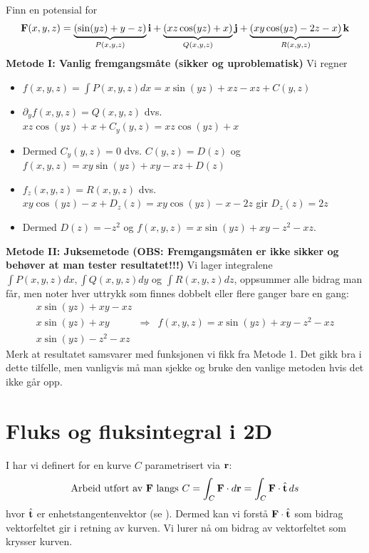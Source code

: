 
\begin{eks}{}
Finn en potensial for 
\[\mathbf{F}(x,y,z)=\underbrace{(\sin(yz)+y-z)}_{P(x,y,z)}\mathbf{i}+\underbrace{(xz\cos(yz)+x)}_{Q(x,y,z)}\mathbf{j}+\underbrace{(xy\cos(yz)-2z-x)}_{R(x,y,z)}\mathbf{k}\]
\textbf{Metode I: Vanlig fremgangsmåte (sikker og uproblematisk)} Vi regner
\begin{itemize}
\item $f(x,y,z)=\int P(x,y,z)dx = x\sin(yz)+xz-xz+C(y,z)$
\item $\partial_y f(x,y,z) = Q(x,y,z)$ dvs. $xz\cos (yz)+x+C_y(y,z)=xz\cos(yz)+x$
\item Dermed $C_y(y,z)=0$ dvs. $C(y,z)=D(z)$ og $f(x,y,z)=xy\sin (yz)+xy-xz+D(z)$
\item $f_z(x,y,z)=R(x,y,z)$ dvs. $xy\cos(yz)-x+D_z(z)=xy\cos(yz)-x-2z$ gir $D_z(z)=2z$
\item Dermed $D(z)=-z^2$ og $f(x,y,z)=x\sin(yz)+xy-z^2-xz$.
\end{itemize}
\textbf{Metode II: Juksemetode (OBS: Fremgangsmåten er ikke sikker og behøver at man tester resultatet!!!)}
Vi lager integralene $\int P(x,y,z)dx, \int Q(x,y,z)dy$ og $\int R(x,y,z)dz$, oppsummer alle bidrag man får, men noter hver uttrykk som finnes dobbelt eller flere ganger bare en gang:
\begin{align*}
x\sin(yz)+xy-xz &&\\
x \sin (yz)+xy  & \Rightarrow& f(x,y,z)=x\sin (yz)+xy-z^2-xz\\
x\sin (yz)-z^2-xz &&
\end{align*}
Merk at resultatet samsvarer med funksjonen vi fikk fra Metode 1. Det gikk bra i dette tilfelle, men vanligvis må man sjekke og bruke den vanlige metoden hvis det ikke går opp.
\end{eks}

%
%
%
\section{Fluks og fluksintegral i 2D}

I  har vi definert for en kurve $C$ parametrisert via $\mathbf{r}$:
\[
\text{Arbeid utført av } \mathbf{F} \text{ langs } C = \int_C \mathbf{F} \cdot d\mathbf{r} = \int_C \mathbf{F} \cdot \hat{\mathbf{t}} \, ds
\]
hvor $\hat{\mathbf{t}}$ er enhetstangentenvektor (se ). Dermed kan vi forstå $\mathbf{F} \cdot \hat{\mathbf{t}}$ som bidrag vektorfeltet gir i retning av kurven. Vi lurer nå om bidrag av vektorfeltet som krysser kurven.

